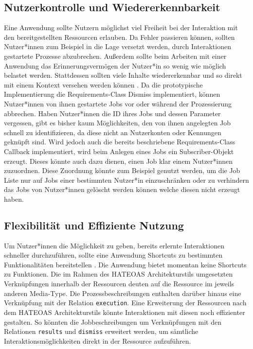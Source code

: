 \subsection{Nutzerkontrolle und Wiedererkennbarkeit}
Eine Anwendung sollte Nutzern möglichst viel Freiheit bei der Interaktion mit den bereitgestellten Ressourcen 
erlauben. Da Fehler passieren können, sollten Nutzer*innen zum Beispiel in die Lage versetzt werden, 
durch Interaktionen gestartete Prozesse abzubrechen. Außerdem sollte beim Arbeiten mit einer Anwendung das Erinnerungsvermögen 
der Nutzer*in so wenig wie möglich belastet werden. Stattdessen sollten viele Inhalte wiedererkennbar und so 
direkt mit einem Kontext versehen werden können \cite{usability_engineering,nielsen_poster,heuristics_website}.
Da die prototypische Implementierung die Requirements-Class Dismiss implementiert, können Nutzer*innen von ihnen 
gestartete Jobs vor oder während der Prozessierung abbrechen. 
Haben Nutzer*innen die ID ihres Jobs und dessen Parameter vergessen, gibt es bisher kaum Möglichkeiten, den 
von ihnen angelegten Job schnell zu identifizieren, da diese nicht an Nutzerkonten oder Kennungen geknüpft sind.
Wird jedoch auch die bereits beschriebene Requirements-Class Callback implementiert, wird beim Anlegen eines Jobs ein 
Subscriber-Objekt erzeugt. Dieses könnte auch dazu dienen, einen Job klar einem Nutzer*innen zuzuordnen. Diese Zuordnung 
könnte zum Beispiel genutzt werden, um die Job Liste nur auf Jobs einer bestimmten Nutzer*in einzuschränken oder 
zu verhindern das Jobs von Nutzer*innen gelöscht werden können welche diesen nicht erzeugt haben.

\subsection{Flexibilität und Effiziente Nutzung}
Um Nutzer*innen die Möglichkeit zu geben, bereits erlernte Interaktionen schneller durchzuführen, sollte eine 
Anwendung Shortcuts zu bestimmten Funktionalitäten bereitstellen \cite{usability_engineering,nielsen_poster}. 
Die Anwendung bietet momentan keine Shortcuts zu Funktionen. Die im Rahmen des HATEOAS Architekturstils umgesetzten 
Verknüpfungen innerhalb der Ressourcen deuten auf die Ressource im jeweils anderen Media-Type. Die Prozessbeschreibungen 
enthalten darüber hinaus eine Verknüpfung mit der Relation \verb|execution|. 
Eine Erweiterung der Ressourcen nach dem HATEOAS Architekturstils könnte Interaktionen mit diesen noch effizienter 
gestalten. So könnten die Jobbeschreibungen um Verknüpfungen mit den Relationen \verb|results| und \verb|dismiss| erweitert werden, um sämtliche
Interaktionsmöglichkeiten direkt in der Ressource aufzuführen. 

